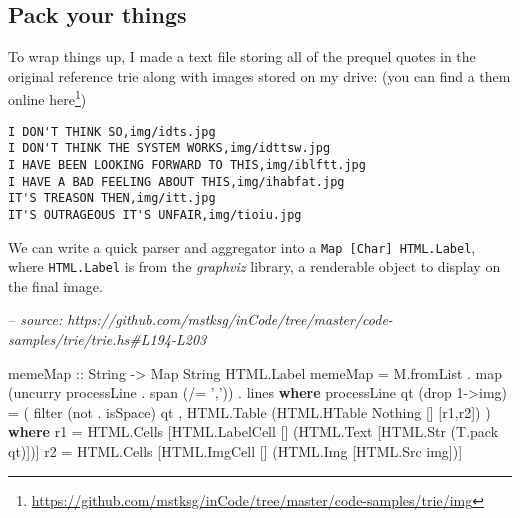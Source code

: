 \documentclass[]{article}
\newenvironment{Shaded}{}{}
\newcommand{\CharTok}[1]{\textcolor[rgb]{0.25,0.44,0.63}{#1}}
\newcommand{\CommentTok}[1]{\textcolor[rgb]{0.38,0.63,0.69}{\textit{#1}}}
\newcommand{\DataTypeTok}[1]{\textcolor[rgb]{0.56,0.13,0.00}{#1}}
\newcommand{\DecValTok}[1]{\textcolor[rgb]{0.25,0.63,0.44}{#1}}
\newcommand{\FunctionTok}[1]{\textcolor[rgb]{0.02,0.16,0.49}{#1}}
\newcommand{\KeywordTok}[1]{\textcolor[rgb]{0.00,0.44,0.13}{\textbf{#1}}}
\newcommand{\NormalTok}[1]{#1}
\newcommand{\OtherTok}[1]{\textcolor[rgb]{0.00,0.44,0.13}{#1}}
\renewcommand{\href}[2]{#2\footnote{\url{#1}}}
\begin{document}
\hypertarget{pack-your-things}{%
\subsection{Pack your things}\label{pack-your-things}}

To wrap things up, I made a text file storing all of the prequel quotes in the
original reference trie along with images stored on my drive: (you can find a
them
\href{https://github.com/mstksg/inCode/tree/master/code-samples/trie/img}{online
here})

\begin{verbatim}
I DON'T THINK SO,img/idts.jpg
I DON'T THINK THE SYSTEM WORKS,img/idttsw.jpg
I HAVE BEEN LOOKING FORWARD TO THIS,img/iblftt.jpg
I HAVE A BAD FEELING ABOUT THIS,img/ihabfat.jpg
IT'S TREASON THEN,img/itt.jpg
IT'S OUTRAGEOUS IT'S UNFAIR,img/tioiu.jpg
\end{verbatim}

We can write a quick parser and aggregator into a
\texttt{Map\ {[}Char{]}\ HTML.Label}, where \texttt{HTML.Label} is from the
\emph{graphviz} library, a renderable object to display on the final image.

\begin{Shaded}
\begin{Highlighting}[]
\CommentTok{-- source: https://github.com/mstksg/inCode/tree/master/code-samples/trie/trie.hs#L194-L203}

\OtherTok{memeMap ::} \DataTypeTok{String} \OtherTok{->} \DataTypeTok{Map} \DataTypeTok{String} \DataTypeTok{HTML.Label}
\NormalTok{memeMap }\FunctionTok{=}\NormalTok{ M.fromList }\FunctionTok{.} \FunctionTok{map}\NormalTok{ (}\FunctionTok{uncurry}\NormalTok{ processLine }\FunctionTok{.} \FunctionTok{span}\NormalTok{ (}\FunctionTok{/=} \CharTok{','}\NormalTok{)) }\FunctionTok{.} \FunctionTok{lines}
  \KeywordTok{where}
\NormalTok{    processLine qt (}\FunctionTok{drop} \DecValTok{1}\OtherTok{->}\NormalTok{img) }\FunctionTok{=}\NormalTok{ (}
          \FunctionTok{filter}\NormalTok{ (}\FunctionTok{not} \FunctionTok{.} \FunctionTok{isSpace}\NormalTok{) qt}
\NormalTok{        , }\DataTypeTok{HTML.Table}\NormalTok{ (}\DataTypeTok{HTML.HTable} \DataTypeTok{Nothing}\NormalTok{ [] [r1,r2])}
\NormalTok{        )}
      \KeywordTok{where}
\NormalTok{        r1 }\FunctionTok{=} \DataTypeTok{HTML.Cells}\NormalTok{ [}\DataTypeTok{HTML.LabelCell}\NormalTok{ [] (}\DataTypeTok{HTML.Text}\NormalTok{ [}\DataTypeTok{HTML.Str}\NormalTok{ (T.pack qt)])]}
\NormalTok{        r2 }\FunctionTok{=} \DataTypeTok{HTML.Cells}\NormalTok{ [}\DataTypeTok{HTML.ImgCell}\NormalTok{   [] (}\DataTypeTok{HTML.Img}\NormalTok{ [}\DataTypeTok{HTML.Src}\NormalTok{ img])]}
\end{Highlighting}
\end{Shaded}
\end{document}
